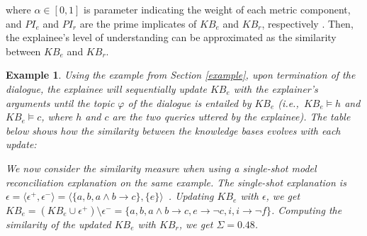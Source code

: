 \documentclass[letterpaper]{article} %
\newtheorem{example}{\bf Example}
\begin{document}
\noindent where $\alpha \in [0,1]$ is parameter indicating the weight of each metric component, and $PI_e$ and $PI_r$ are the prime implicates of $KB_e$ and $KB_r$, respectively \cite{jackson1992computing}. Then, the explainee's level of understanding can be approximated as the similarity between $KB_e$ and $KB_r$. %

\begin{example}
    Using the example from Section \ref{example}, upon termination of the dialogue, the explainee will sequentially update $KB_e$ with the explainer's arguments until the topic $\varphi$ of the dialogue is entailed by $KB_e$ (i.e.,~$KB_e \models h$ and $KB_e \models c$, where $h$ and $c$ are the two queries uttered by the explainee). The table below shows how the similarity between the knowledge bases evolves with each update:
\begin{table}[!h]
\renewcommand{\arraystretch}{1.6}
\setlength{\tabcolsep}{3pt}
\end{table}

\noindent We now consider the similarity measure when using a single-shot model reconciliation explanation on the same example. The single-shot explanation is $\epsilon = \langle \epsilon^+, \epsilon^- \rangle = \langle \{ a, b, a\land b \!\rightarrow\! c \}, \{e\} \rangle$~\cite{vasileioulogic}. Updating $KB_e$ with $\epsilon$, we get $KB_e = (KB_e \cup \epsilon^+)\setminus \epsilon^- = \{a, b, a\land b \!\rightarrow\! c , e\!\rightarrow\! \neg c, i, i \!\rightarrow\! \neg f \}$. Computing the similarity of the updated $KB_e$ with $KB_r$, we get $\Sigma = 0.48$.
\end{example}
\end{document}
